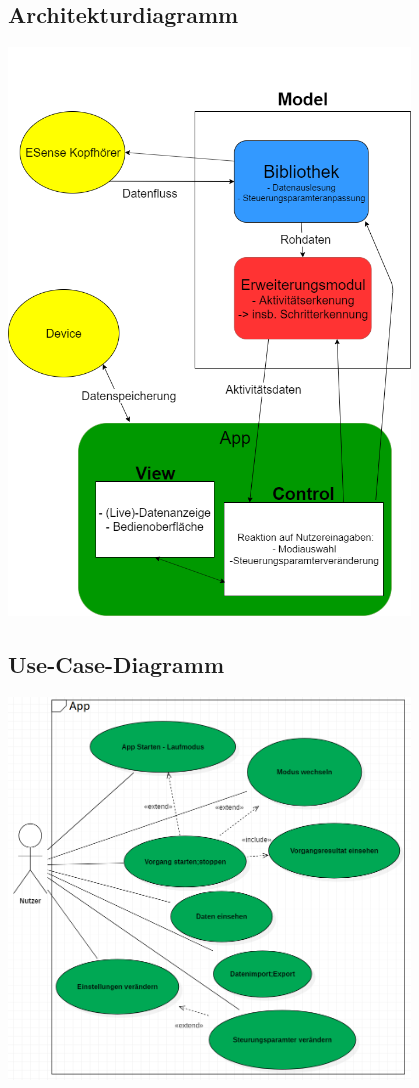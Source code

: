 \documentclass[a4paper,12pt]{article}
\begin{document}
  \subsection{Architekturdiagramm}
  \begin{center}
  	\vspace{100px}
  	\includegraphics[width=0.8\textwidth]{NeuesArchitekturdiagramm.png}
  \end{center}
  
  \subsection{Use-Case-Diagramm}
  \begin{center}
	\includegraphics[width=0.8\textwidth]{Use-CaseDiagramm.png} 
  \end{center}
\end{document}

